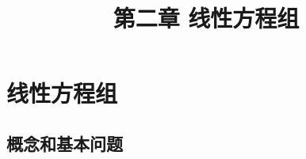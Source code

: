 \renewcommand{\mydate}{2025年2月27号 第二次课}
\makeatletter
\ifodd\value{page}
\else
\begin{frame}[plain]\end{frame}
\fi
\makeatother
\section{线性方程组}
\title{第二章 \quad 线性方程组}
\author{}
\date{}
\frame{\titlepage}

\subsection{概念和基本问题}


